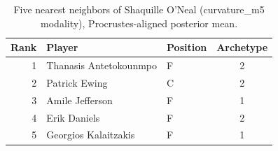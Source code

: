 \begin{table}[htbp]
  \centering\small
  \begin{tabular}{rllc}
    \toprule
    Rank & Player & Position & Archetype \\
    \midrule
    1 & Thanasis Antetokounmpo & F & 2 \\
    2 & Patrick Ewing & C & 2 \\
    3 & Amile Jefferson & F & 1 \\
    4 & Erik Daniels & F & 2 \\
    5 & Georgios Kalaitzakis & F & 1 \\
    \bottomrule
  \end{tabular}
  \caption{Five nearest neighbors of Shaquille O'Neal (curvature_m5 modality), Procrustes-aligned posterior mean.}
  \label{tab:Shaquille_O_Neal_neighbors_curvature_m5}
\end{table}

